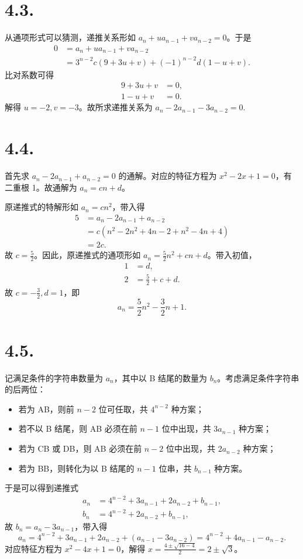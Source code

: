 \documentclass{article}
\begin{document}
\section*{4.3.}
从通项形式可以猜测，递推关系形如 $a_n+ua_{n-1}+va_{n-2}=0$。于是
\begin{align}
    0&=a_n+ua_{n-1}+va_{n-2} \\
    &=3^{n-2}c(9+3u+v)+(-1)^{n-2}d(1-u+v).
\end{align}
比对系数可得
\begin{align}
    9+3u+v&=0, \\
    1-u+v&=0.
\end{align}
解得 $u=-2,v=-3$。故所求递推关系为 $a_n-2a_{n-1}-3a_{n-2}=0$.

\section*{4.4.}
首先求 $a_n-2a_{n-1}+a_{n-2}=0$ 的通解。对应的特征方程为 $x^2-2x+1=0$，有二重根 1。故通解为 $a_n=cn+d$。

原递推式的特解形如 $a_n=cn^2$，带入得
\begin{align}
    5&=a_n-2a_{n-1}+a_{n-2} \\
    &=c(n^2-2n^2+4n-2+n^2-4n+4) \\
    &=2c.
\end{align}
故 $c=\frac 52$。因此，原递推式的通项形如 $a_n=\frac 52n^2+cn+d$。带入初值，
\begin{align}
    1&=d, \\
    2&=\frac 52+c+d.
\end{align}
故 $c=-\frac 32,d=1$，即
\begin{equation}
    a_n=\frac 52n^2-\frac 32n+1.
\end{equation}

\section*{4.5.}
记满足条件的字符串数量为 $a_n$，其中以 B 结尾的数量为 $b_n$。考虑满足条件字符串的后两位：
\begin{itemize}
    \item 若为 AB，则前 $n-2$ 位可任取，共 $4^{n-2}$ 种方案；
    \item 若不以 B 结尾，则 AB 必须在前 $n-1$ 位中出现，共 $3a_{n-1}$ 种方案；
    \item 若为 CB 或 DB，则 AB 必须在前 $n-2$ 位中出现，共 $2a_{n-2}$ 种方案；
    \item 若为 BB，则转化为以 B 结尾的 $n-1$ 位串，共 $b_{n-1}$ 种方案。
\end{itemize}
于是可以得到递推式
\begin{align}
    a_n&=4^{n-2}+3a_{n-1}+2a_{n-2}+b_{n-1}, \\
    b_n&=4^{n-2}+2a_{n-2}+b_{n-1},
\end{align}
故 $b_n=a_n-3a_{n-1}$，带入得
\begin{equation}
    a_n=4^{n-2}+3a_{n-1}+2a_{n-2}+(a_{n-1}-3a_{n-2})=4^{n-2}+4a_{n-1}-a_{n-2}.
\end{equation}
对应特征方程为 $x^2-4x+1=0$，解得 $x=\frac{4\pm\sqrt{16-4}}{2}=2\pm\sqrt 3$。
\end{document}
